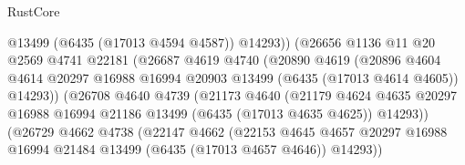 \begin{lexlean}{RustCore}
\begin{coremodule}
                                    @13499
                                    (@6435 (@17013 @4594 @4587))
                                    @14293))
                                (@26656
                                  @1136
                                  @11
                                  @20
                                  @2569
                                  @4741
                                  @22181
                                  (@26687
                                    @4619
                                    @4740
                                    (@20890
                                      @4619
                                      (@20896
                                        @4604
                                        @4614
                                        @20297
                                        @16988
                                        @16994
                                        @20903
                                        @13499
                                        (@6435 (@17013 @4614 @4605))
                                        @14293))
                                    (@26708
                                      @4640
                                      @4739
                                      (@21173
                                        @4640
                                        (@21179
                                          @4624
                                          @4635
                                          @20297
                                          @16988
                                          @16994
                                          @21186
                                          @13499
                                          (@6435 (@17013 @4635 @4625))
                                          @14293))
                                      (@26729
                                        @4662
                                        @4738
                                        (@22147
                                          @4662
                                          (@22153
                                            @4645
                                            @4657
                                            @20297
                                            @16988
                                            @16994
                                            @21484
                                            @13499
                                            (@6435 (@17013 @4657 @4646))
                                            @14293))

\end{coremodule}
\end{lexlean}
